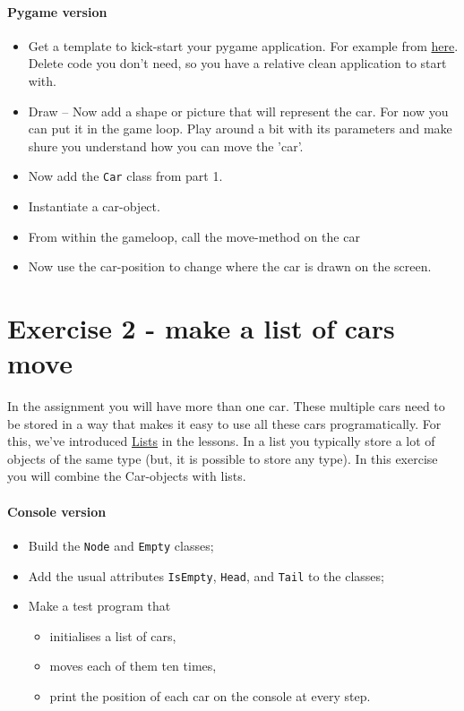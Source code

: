 \documentclass[12pt,a4paper]{article}
\begin{document}
		\paragraph*{Pygame version}
			\begin{itemize}
			    \item Get a template to kick-start your pygame application.
			    For example from \href{http://openbookproject.net/thinkcs/python/english3e/pygame.html}{here}.
			    Delete code you don't need, so you have a relative clean application to start with.
			    \item Draw -- Now add a shape or picture that will represent the car.
			        For now you can put it in the game loop.
			        Play around a bit with its parameters and make shure you understand how you can move the 'car'.
			    \item Now add the \texttt{Car} class from part 1.
			    \item Instantiate a car-object.
			    \item From within the gameloop, call the move-method on the car
			    \item Now use the car-position to change where the car is drawn on the screen.
			\end{itemize}



	\section{Exercise 2 - make a list of cars move}
	    In the assignment you will have more than one car.
	    These multiple cars need to be stored in a way that makes it easy to use all these cars programatically.
	    For this, we've introduced \href{https://github.com/hogeschool/INFDEV02-2/raw/master/Slides/Lecture%20II%20-%20lists.pdf}{Lists} in the lessons.
	    In a list you typically store a lot of objects of the same type (but, it is possible to store any type).
	    In this exercise you will combine the Car-objects with lists.

		\paragraph*{Console version}
			\begin{itemize}
				\item Build the \texttt{Node} and \texttt{Empty} classes;
				\item Add the usual attributes \texttt{IsEmpty}, \texttt{Head}, and \texttt{Tail} to the classes;
				\item Make a test program that
				 \begin{itemize}
				    \item initialises a list of cars,
				    \item moves each of them ten times,
				    \item print the position of each car on the console at every step.
			    \end{itemize}
			\end{itemize}
\end{document}
